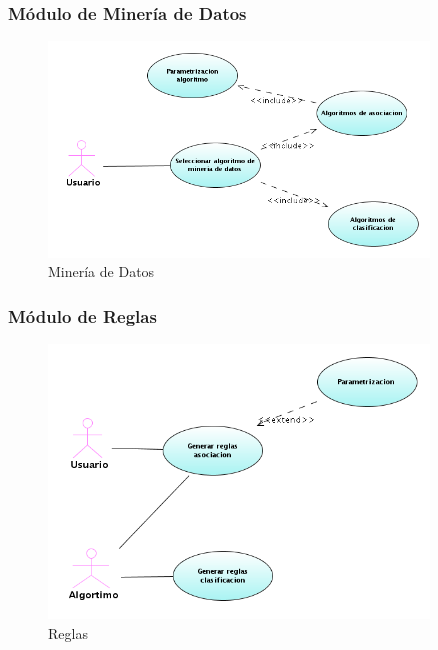 \subsubsection{M\'odulo de Miner\'ia de Datos}
\begin{figure}[h]
 \centering
 \includegraphics[width=0.9\textwidth]{imgsCasosUso/06mineria.png}
 \caption{Miner\'ia de Datos}
\end{figure}
\newpage

\subsubsection{M\'odulo de Reglas}
\begin{figure}[h]
 \centering
 \includegraphics[width=0.9\textwidth]{imgsCasosUso/07reglas.png}
 \caption{Reglas}
\end{figure}
\newpage

